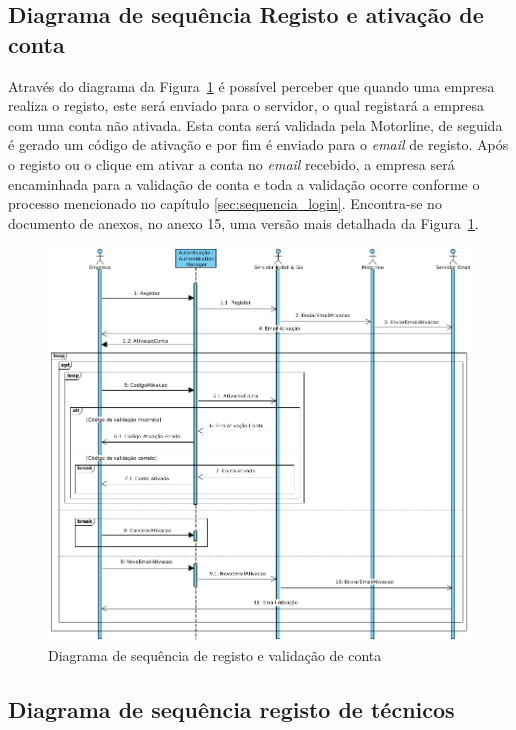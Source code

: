 \newpage

\subsection{Diagrama de sequência Registo e ativação de conta}

Através do diagrama da Figura~\ref{fig:44} é possível perceber que quando uma empresa realiza o registo, este será enviado para o servidor, o qual registará a empresa com uma conta não ativada. Esta conta será validada pela Motorline, de seguida é gerado um código de ativação e por fim é enviado para o \textit{email} de registo. Após o registo ou o clique em ativar a conta no \textit{email} recebido, a empresa será encaminhada para a validação de conta e toda a validação ocorre conforme o processo mencionado no capítulo \ref{sec:sequencia_login}. Encontra-se no documento de anexos, no anexo 15, uma versão mais detalhada da Figura~\ref*{fig:44}.


\begin{figure}[htb]
  \centering
  \includegraphics[width=\textwidth]{images/diagramas/sequencia/diagrama_registo.png}
  \caption{Diagrama de sequência de registo e validação de conta}
  \label{fig:44}
\end{figure}

\newpage

\subsection{Diagrama de sequência registo de técnicos}


